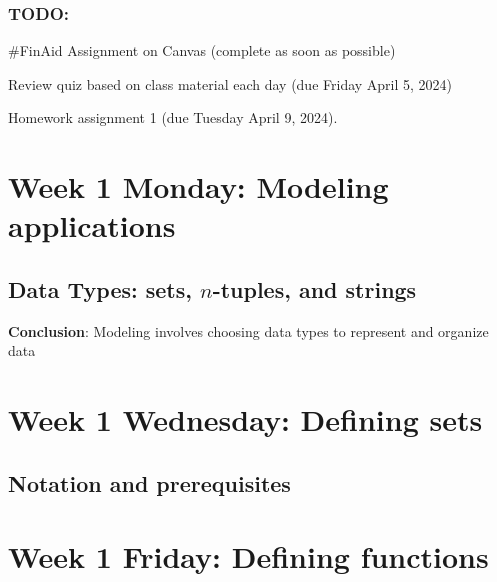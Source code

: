 \subsubsection*{TODO:}
\begin{list}
   {\itemsep2pt}
   \item \#FinAid Assignment on Canvas (complete as soon as possible) 
   \item Review quiz based on class material each day (due Friday April 5, 2024)
   \item Homework assignment 1 (due Tuesday April 9, 2024).
\end{list}

\newpage

\section*{Week 1 Monday: Modeling applications}


\vfill
\subsection*{Data Types: sets, $n$-tuples, and strings}

\newpage

\vfill
{\bf Conclusion}: Modeling involves choosing data types to represent and organize data

\newpage
\section*{Week 1 Wednesday: Defining sets}
\subsection*{Notation and prerequisites}


\newpage





\section*{Week 1 Friday: Defining functions}





